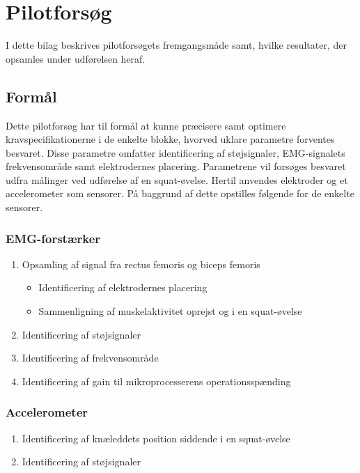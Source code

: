\section{Pilotforsøg}
I dette bilag beskrives pilotforsøgets fremgangsmåde samt, hvilke resultater, der opsamles under udførelsen heraf. 

\subsection{Formål}
Dette pilotforsøg har til formål at kunne præcisere samt optimere kravspecifikationerne i de enkelte blokke, hvorved uklare parametre forventes besvaret. Disse parametre omfatter identificering af støjsignaler, EMG-signalets frekvensområde samt elektrodernes placering. Parametrene vil forsøges besvaret udfra målinger ved udførelse af en squat-øvelse.
Hertil anvendes elektroder og et accelerometer som sensorer. På baggrund af dette opstilles følgende for de enkelte sensorer.  

\subsubsection{EMG-forstærker}
\begin{enumerate}
\item Opsamling af signal fra rectus femoris og biceps femoris
\begin{itemize}
\item Identificering af elektrodernes placering
\item Sammenligning af muskelaktivitet oprejst og i en squat-øvelse 
\end{itemize}
\item Identificering af støjsignaler
\item Identificering af frekvensområde
\item Identificering af gain til mikroprocesserens operationsspænding 
\end{enumerate}

\subsubsection{Accelerometer}
\begin{enumerate}
\item Identificering af knæleddets position siddende i en squat-øvelse
\item Identificering af støjsignaler
\end{enumerate}


